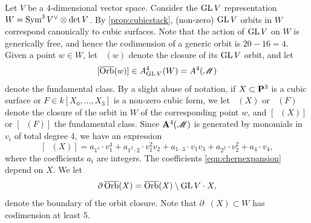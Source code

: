 \documentclass[12pt,reqno]{amsart}
\DeclareMathOperator{\Orb}{\overline{Orb}}
\numberwithin{equation}{section}
\begin{document}
Let $V$ be a $4$-dimensional vector space.
Consider the $\GL V$ representation $W = \Sym^3 V^\vee \otimes \det V$.
By \autoref{prop:cubicstack}, (non-zero) $\GL V$ orbits in $W$ correspond canonically to cubic surfaces.
Note that the action of $\GL V$ on $W$ is generically free, and hence the codimension of a generic orbit is $20-16 = 4$.
Given a point $w \in W$, let $\Orb(w)$ denote the closure of its $\GL V$ orbit, and let
\[ [\Orb(w)] \in A^4_{\GL V}(W) = A^4(\mathscr M)\]
denote the fundamental class.
By a slight abuse of notation, if $X \subset \P^3$ is a cubic surface or $F \in k[X_0, \dots, X_3]$ is a non-zero cubic form, we let $\Orb(X)$ or $\Orb(F)$ denote the closure of the orbit in $W$ of the corresponding point $w$, and $[\Orb(X)]$ or $[\Orb(F)]$ the fundamental class.
Since $\A^4(\mathscr M)$ is generated by monomials in $v_i$ of total degree 4, we have an expression
\begin{equation}\label{eqn:chernexpansion}
  [\Orb(X)] = a_{1^4} \cdot v_1^4 + a_{1^2\cdot 2} \cdot v_1^2v_2 + a_{1\cdot 3} \cdot v_1v_3 + a_{2^2} \cdot v_2^2 + a_4 \cdot v_4,
\end{equation}
where the coefficients $a_i$ are integers.
The coefficients \eqref{eqn:chernexpansion} depend on $X$.
We let
\[ \partial \Orb(X) = \Orb(X) \setminus \GL V \cdot X,\]
denote the boundary of the orbit closure.
Note that $\partial \Orb(X) \subset W$ has codimension at least $5$.
\end{document}
